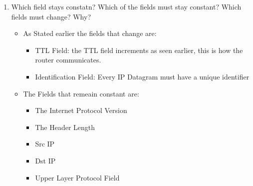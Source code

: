 \documentclass{article}
\begin{document}
\begin{enumerate}
      \item Which field stays constatn?  Which of the fields must stay constant?  Which fields must change? Why?
          \begin{itemize}
            \item As Stated earlier the fields that change are:
              \begin{itemize}
                \item TTL Field: the TTL field increments as seen earlier, this is how the router communicates.
                \item Identification Field: Every IP Datagram must have a unique identifier
              \end{itemize}
            \item The Fields that remeain constant are:
              \begin{itemize}
                \item The Internet Protocol Version
                \item The Header Length
                \item Src IP
                \item Dst IP
                \item Upper Layer Protocol Field
              \end{itemize}
              

\end{itemize}
\end{enumerate}
\end{document}
